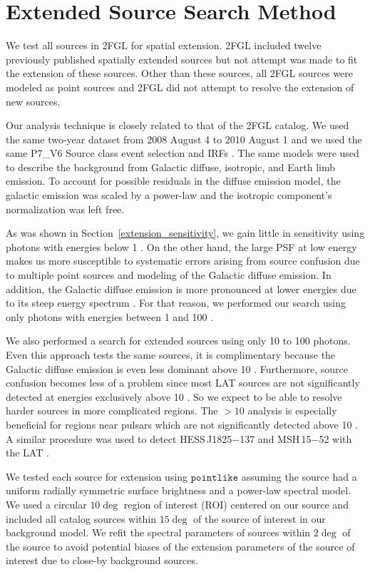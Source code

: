 \documentclass[12pt,preprint]{aastex}
\newcommand{\gev}{\text{GeV}\xspace}
\newcommand{\pointlike}{\ensuremath{\mathtt{pointlike}}\xspace}
\begin{document}
\section{Extended Source Search Method}
\label{extended_source_search_method}

We test all sources in 2FGL for spatial extension.
2FGL included
twelve previously published spatially extended sources but not
attempt was made to fit the extension of these sources. Other than these sources,
all 2FGL sources were modeled as point sources and 2FGL did not attempt
to resolve the extension of new sources.

Our analysis technique is closely related to that 
of the 2FGL catalog. We used the same two-year dataset from 2008 August 4
to 2010 August 1 and we used the same P7\_V6 Source class
event selection and IRFs \citep{lat_on_orbit_psf}.  
The same 
models were used to describe the background from Galactic diffuse, isotropic, and
Earth limb emission.  To account for possible residuals in the diffuse
emission model, the galactic emission was scaled by a power-law
and the isotropic component's normalization was left free.

As was shown in Section~\ref{extension_sensitivity}, we gain little in sensitivity using photons with energies
below 1 \gev. On the other hand, the large PSF at low energy makes us
more susceptible to systematic errors arising from source confusion due
to multiple point sources and modeling of the
Galactic diffuse emission. In addition, the Galactic diffuse emission
is more pronounced at lower energies due to its steep energy spectrum
\citep{intermediate_diffuse_lat}.
For that reason, we performed our search using only photons with
energies between 1 \gev and 100 \gev. 

We also performed a search for extended sources using only 10 \gev to 100 \gev photons. 
Even this approach tests the same
sources, it is complimentary because the Galactic diffuse
emission is even less dominant above 10 \gev. Furthermore, source
confusion becomes less of a problem since most LAT sources are not
significantly detected at energies exclusively above 10 \gev. So we
expect to be able to resolve harder sources in more complicated regions. The $>10$ \gev
analysis is
especially
beneficial for regions near pulsars which are not significantly detected 
above 10 \gev. A similar procedure was
used to detect HESS\,J1825$-$137 and MSH\,15$-$52 with the LAT
\citep{msh1552,fermi_hess_j1825}.

We tested each source for extension using
\pointlike
assuming the source had a uniform radially symmetric surface brightness
and a power-law spectral model.
We used a circular $10\deg$ region of interest (ROI) centered on our source and
included all catalog sources within $15\deg$ of the source of interest
in our background model.
We refit the spectral parameters of sources within $2\deg$ of the source
to avoid potential biases of the extension parameters of the source of
interest due to close-by background sources.
\end{document}

